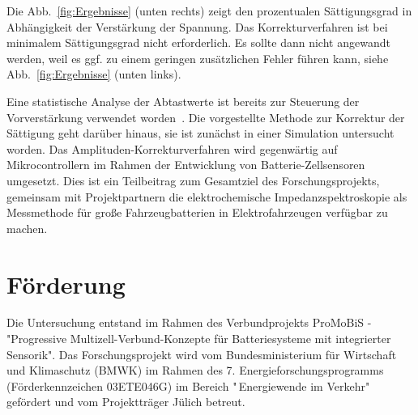 \smallskip
Die Abb.~\ref{fig:Ergebnisse} (unten rechts) zeigt den prozentualen Sättigungsgrad in Abhängigkeit der Verstärkung der Spannung. Das Korrekturverfahren ist bei minimalem Sättigungsgrad nicht erforderlich. Es sollte dann nicht angewandt werden, weil es ggf. zu einem geringen zusätzlichen Fehler führen kann, siehe Abb.~\ref{fig:Ergebnisse} (unten links). 

Eine statistische Analyse der Abtastwerte ist bereits zur Steuerung der Vorverstärkung verwendet worden~\cite{Frahm-2023}. Die vorgestellte Methode zur Korrektur der Sättigung geht darüber hinaus, sie ist zunächst in einer Simulation untersucht worden. Das Amplituden-Korrekturverfahren wird gegenwärtig auf Mikrocontrollern im Rahmen der Entwicklung von Batterie-Zellsensoren umgesetzt. Dies ist ein Teilbeitrag zum Gesamtziel des Forschungsprojekts, gemeinsam mit Projektpartnern die elektrochemische Impedanzspektroskopie als Messmethode für große Fahrzeugbatterien in Elektrofahrzeugen verfügbar zu machen.

\section*{Förderung}
Die Untersuchung entstand im Rahmen des Verbundprojekts ProMoBiS - "Progressive Multizell-Verbund-Konzepte für Batteriesysteme mit integrierter Sensorik". Das Forschungsprojekt wird vom Bundesministerium für Wirtschaft und Klimaschutz (BMWK) im Rahmen des 7. Energieforschungsprogramms (Förderkennzeichen 03ETE046G) im Bereich "\,Energiewende im Verkehr"\,gefördert und vom Projektträger Jülich betreut.
   
